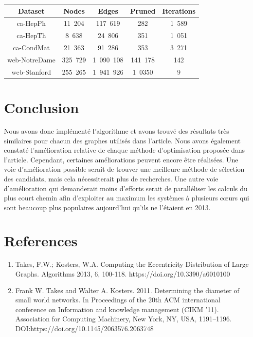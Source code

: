 \documentclass[11pt]{article}
\begin{document}
\begin{center}
 \begin{tabular}{||c c c c c||} 
   \hline
   Dataset & Nodes & Edges & Pruned & Iterations \\
   \hline\hline
   ca-HepPh & 11\ 204 & 117\ 619 & 282 & 1\ 589 \\
   \hline
   ca-HepTh & 8\ 638 & 24\ 806 & 351 & 1\ 051 \\
   \hline
   ca-CondMat & 21\ 363 & 91\ 286 & 353 & 3\ 271 \\ 
   \hline
   web-NotreDame & 325\ 729 & 1\ 090\ 108 & 141\ 178 & 142 \\
   \hline
   web-Stanford & 255\ 265 & 1\ 941\ 926 & 1\ 0350 & 9 \\
   \hline
 \end{tabular}
\end{center}
\section{Conclusion}
Nous avons donc implémenté l'algorithme et avons trouvé des résultats très
similaires pour chacun des graphes utilisés dans l'article. Nous avons également
constaté l'amélioration relative de chaque méthode d'optimisation proposée dans
l'article. Cependant, certaines améliorations peuvent encore être réalisées. Une
voie d'amélioration possible serait de trouver une meilleure méthode de
sélection des candidats, mais cela nécessiterait plus de recherches. Une autre
voie d'amélioration qui demanderait moins d'efforts serait de paralléliser les
calculs du plus court chemin afin d'exploiter au maximum les systèmes à
plusieurs cœurs qui sont beaucoup plus populaires aujourd'hui qu'ils ne
l'étaient en 2013.
\section{References}
\begin{enumerate}
\item Takes, F.W.; Kosters, W.A. Computing the Eccentricity Distribution of Large Graphs. Algorithms 2013, 6, 100-118. https://doi.org/10.3390/a6010100
\item Frank W. Takes and Walter A. Kosters. 2011. Determining the diameter of small world networks. In Proceedings of the 20th ACM international conference on Information and knowledge management (CIKM '11). Association for Computing Machinery, New York, NY, USA, 1191–1196. DOI:https://doi.org/10.1145/2063576.2063748
\end{enumerate}
\end{document}
